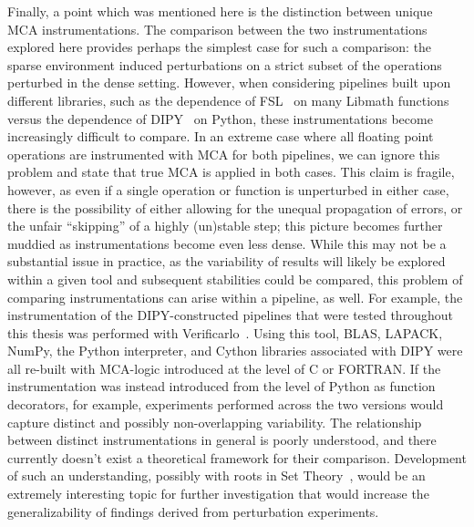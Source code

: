 Finally, a point which was mentioned here is the distinction between unique MCA instrumentations. The comparison
between the two instrumentations explored here provides perhaps the simplest case for such a comparison: the
sparse environment induced perturbations on a strict subset of the operations perturbed in the dense setting.
However, when considering pipelines built upon different libraries, such as the dependence of
FSL~\cite{Jenkinson2012-ly} on many Libmath functions~\cite{salari2020file} versus the dependence of
DIPY~\cite{Garyfallidis2014-ql} on Python, these instrumentations become increasingly difficult to compare. In an
extreme case where all floating point operations are instrumented with MCA for both pipelines, we can ignore this
problem and state that true MCA is applied in both cases. This claim is fragile, however, as even if a single
operation or function is unperturbed in either case, there is the possibility of either allowing for the unequal
propagation of errors, or the unfair ``skipping'' of a highly (un)stable step; this picture becomes further
muddied as instrumentations become even less dense. While this may not be a substantial issue in practice, as the
variability of results will likely be explored within a given tool and subsequent stabilities could be compared,
this problem of comparing instrumentations can arise within a pipeline, as well. For example, the instrumentation
of the DIPY-constructed pipelines that were tested throughout this thesis was performed with
Verificarlo~\cite{Denis2016-wo}. Using this tool, BLAS, LAPACK, NumPy, the Python interpreter, and Cython
libraries associated with DIPY were all re-built with MCA-logic introduced at the level of C or FORTRAN. If the
instrumentation was instead introduced from the level of Python as function decorators, for example, experiments
performed across the two versions would capture distinct and possibly non-overlapping variability. The
relationship between distinct instrumentations in general is poorly understood, and there currently doesn't exist
a theoretical framework for their comparison. Development of such an understanding, possibly with roots in Set
Theory~\cite{jech2013set}, would be an extremely interesting topic for further investigation that would increase
the generalizability of findings derived from perturbation experiments.


